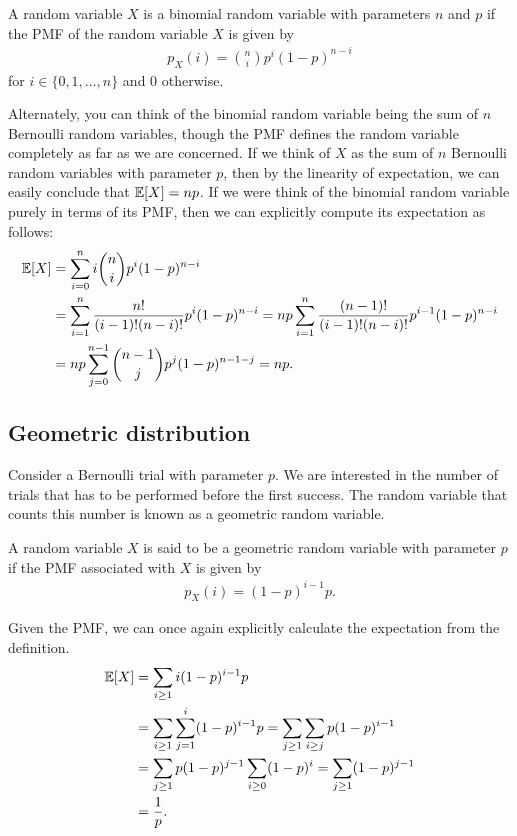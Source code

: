 \begin{definition}
	A random variable $X$ is a binomial random variable with parameters $n$ and $p$ if the PMF of the random variable $X$ is given by 
	\begin{align*}
		p_X(i) = \binom{n}{i} p^i (1-p)^{n-i}
	\end{align*}
	for $i \in \{0,1,\ldots,n\}$ and $0$ otherwise.
	\label{defn:binomial}
\end{definition}

Alternately, you can think of the binomial random variable being the sum of $n$ Bernoulli random variables, though the PMF defines the random variable completely as far as we are concerned. If we think of $X$ as the sum of $n$ Bernoulli random variables with parameter $p$, then by the linearity of expectation, we can easily conclude that $\mathbb{E}[X]=np$. If we were think of the binomial random variable purely in terms of its PMF, then we can explicitly compute its expectation as follows:
\begin{align*}
	\mathbb{E}[X] &= \sum_{i=0}^n i \binom{n}{i} p^i (1-p)^{n-i}\\
	&= \sum_{i=1}^n \frac{n!}{(i-1)!(n-i)!} p^i (1-p)^{n-i} = np\sum_{i=1}^n \frac{(n-1)!}{(i-1)!(n-i)!}p^{i-1}(1-p)^{n-i}\\
	&=np\sum_{j=0}^{n-1} \binom{n-1}{j}p^j(1-p)^{n-1-j} = np.
\end{align*}

\subsection{Geometric distribution}

Consider a Bernoulli trial with parameter $p$. We are interested in the number of trials that has to be performed before the first success. The random variable that counts this number is known as a geometric random variable.

\begin{definition}
	A random variable $X$ is said to be a geometric random variable with parameter $p$ if the PMF associated with $X$ is given by
	\begin{align*}
		p_X(i) = (1-p)^{i-1} p.
	\end{align*}
\end{definition}

Given the PMF, we can once again explicitly calculate the expectation from the definition.
\begin{align*}
	\mathbb{E}[X] &= \sum_{i\geq 1} i (1-p)^{i-1}p \\
	&= \sum_{i \geq 1} \sum_{j=1}^i (1-p)^{i-1} p = \sum_{j\geq 1} \sum_{i\geq j} p(1-p)^{i-1}\\
	&= \sum_{j \geq 1} p(1-p)^{j-1} \sum_{i\geq 0} (1-p)^{i} = \sum_{j \geq 1} (1-p)^{j-1}\\
	&= \frac{1}{p}.
\end{align*}

